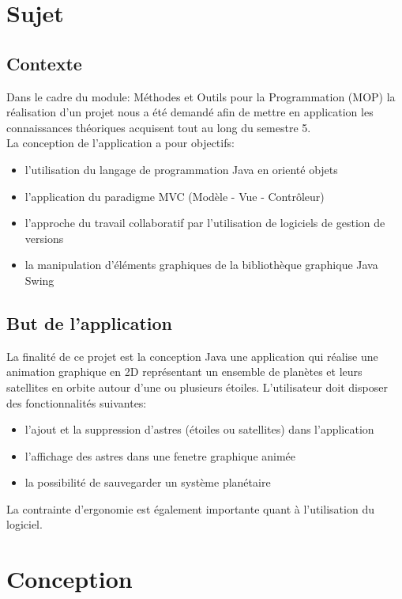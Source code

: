 \documentclass[a4paper,10pt]{article}
\begin{document}
\newpage
\tableofcontents
\newpage

\section{Sujet}
\subsection{Contexte}
Dans le cadre du module: Méthodes et Outils pour la Programmation (MOP) la réalisation d'un projet nous a été demandé afin de mettre
en application les connaissances théoriques acquisent tout au long du semestre 5. \\
La conception de l'application a pour objectifs:
\begin{itemize}
  \item l'utilisation du langage de programmation Java en orienté objets
  \item l'application du paradigme MVC (Modèle - Vue - Contrôleur)
  \item l'approche du travail collaboratif par l'utilisation de logiciels de gestion de versions
  \item la manipulation d'éléments graphiques de la bibliothèque graphique Java Swing
\end{itemize}

\subsection{But de l'application}
La finalité de ce projet est la conception Java une application qui réalise une animation graphique en 2D 
représentant un ensemble de planètes et leurs satellites en orbite autour d'une ou plusieurs étoiles.
L'utilisateur doit disposer des fonctionnalités suivantes:
\begin{itemize}
  \item l'ajout et la suppression d'astres (étoiles ou satellites) dans l'application
  \item l'affichage des astres dans une fenetre graphique animée
  \item la possibilité de sauvegarder un système planétaire 
\end{itemize}
La contrainte d'ergonomie est également importante quant à l'utilisation du logiciel.

\newpage
\section{Conception}
\end{document}

